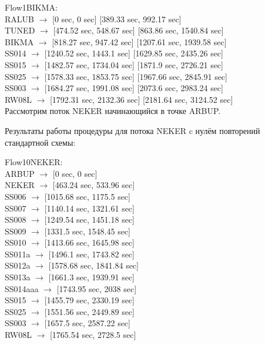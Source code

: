 \documentclass[12pt, a4 paper]{article}
\theoremstyle{plain}
\begin{document}
\noindent Flow1BIKMA:\\
RALUB $\rightarrow$ [0 sec, 0 sec] [389.33 sec, 992.17 sec]\\
TUNED $\rightarrow$ [474.52 sec, 548.67 sec] [863.86 sec, 1540.84 sec]\\
BIKMA $\rightarrow$ [818.27 sec, 947.42 sec] [1207.61 sec, 1939.58 sec]\\
SS014 $\rightarrow$ [1240.52 sec, 1443.1 sec] [1629.85 sec, 2435.26 sec]\\
SS015 $\rightarrow$ [1482.57 sec, 1734.04 sec] [1871.9 sec, 2726.21 sec]\\
SS025 $\rightarrow$ [1578.33 sec, 1853.75 sec] [1967.66 sec, 2845.91 sec]\\
SS003 $\rightarrow$ [1684.27 sec, 1991.08 sec] [2073.6 sec, 2983.24 sec]\\
RW08L $\rightarrow$ [1792.31 sec, 2132.36 sec] [2181.64 sec, 3124.52 sec]\\


Рассмотрим поток NEKER начинающийся в точке ARBUP.

Результаты работы процедуры для потока NEKER c нулём повторений стандартной схемы:

\noindent Flow10NEKER:\\
ARBUP $\rightarrow$ [0 sec, 0 sec]\\
NEKER $\rightarrow$ [463.24 sec, 533.96 sec]\\
SS006 $\rightarrow$ [1015.68 sec, 1175.5 sec]\\
SS007 $\rightarrow$ [1140.14 sec, 1321.61 sec]\\
SS008 $\rightarrow$ [1249.54 sec, 1451.18 sec]\\
SS009 $\rightarrow$ [1331.5 sec, 1548.45 sec]\\
SS010 $\rightarrow$ [1413.66 sec, 1645.98 sec]\\
SS011a $\rightarrow$ [1496.1 sec, 1743.82 sec]\\
SS012a $\rightarrow$ [1578.68 sec, 1841.84 sec]\\
SS013a $\rightarrow$ [1661.3 sec, 1939.91 sec]\\
SS014aaa $\rightarrow$ [1743.95 sec, 2038 sec]\\
SS015 $\rightarrow$ [1455.79 sec, 2330.19 sec]\\
SS025 $\rightarrow$ [1551.56 sec, 2449.89 sec]\\
SS003 $\rightarrow$ [1657.5 sec, 2587.22 sec]\\
RW08L $\rightarrow$ [1765.54 sec, 2728.5 sec]\\
\end{document}
